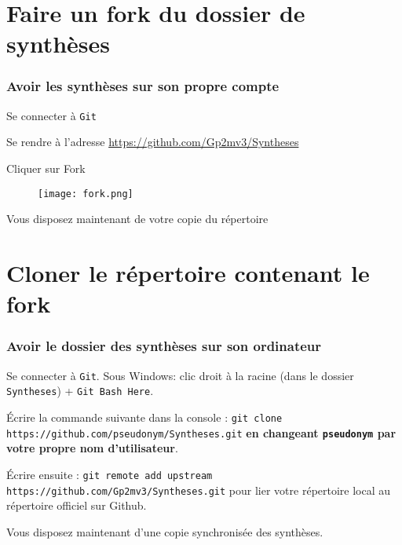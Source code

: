 \documentclass{beamer}
\newenvironment{wideitemize}{\itemize\addtolength{\itemsep}{10pt}}{\enditemize}
\begin{document}
\section{Faire un fork du dossier de synthèses}

\begin{frame}
	\frametitle{Avoir les synthèses sur son propre compte}
		\begin{wideitemize}
			\item Se connecter à \lstinline|Git|
			\pause
			\item Se rendre à l'adresse
                \url{https://github.com/Gp2mv3/Syntheses}
			\pause
			\item Cliquer sur Fork
                \begin{figure}[H]
                    \centering
                    \texttt{[image: fork.png]}
                \end{figure}
			\pause
			\item Vous disposez maintenant de votre copie du répertoire
		\end{wideitemize}
\end{frame}

\section{Cloner le répertoire contenant le fork}

\begin{frame}[fragile]
    \frametitle{Avoir le dossier des synthèses sur son ordinateur}
    \begin{wideitemize}
        \item Se connecter à \lstinline|Git|. Sous Windows: clic droit à la racine (dans le dossier \lstinline|Syntheses|) + \lstinline|Git Bash Here|.
        \pause
        \item Écrire la commande suivante dans la console :
            \lstinline[mathescape]|git clone https://github.com/pseudonym/Syntheses.git| \textbf{en changeant \lstinline|pseudonym| par votre propre nom d'utilisateur}.
        \pause
        \item Écrire ensuite :
            \lstinline[mathescape]|git remote add upstream https://github.com/Gp2mv3/Syntheses.git| pour lier votre répertoire local au répertoire officiel sur Github.
        \pause
        \item Vous disposez maintenant d'une copie synchronisée des
            synthèses.
    \end{wideitemize}
\end{frame}
\end{document}
